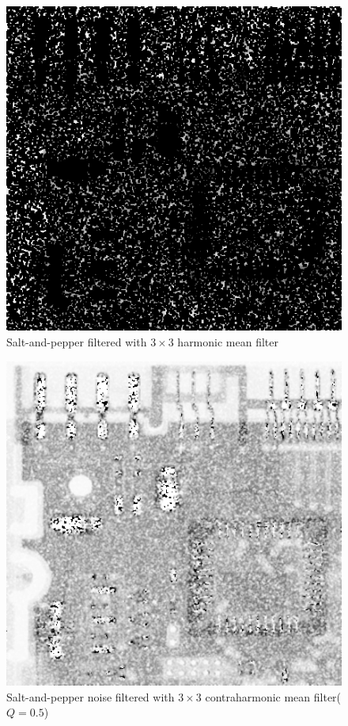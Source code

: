\documentclass{article}
\begin{document}
\begin{figure}[H]
	\centering
	\includegraphics[width=336pt]{../result/task2/sap/sap-harmonic.png}
	\caption{Salt-and-pepper filtered with $3 \times 3$ harmonic mean filter}
	\label{fig:saphm}
\end{figure}


\begin{figure}[H]
	\centering
	\includegraphics[width=336pt]{../result/task2/sap/sap-contraharmonic.png}
	\caption{Salt-and-pepper noise filtered with $3 \times 3$ contraharmonic mean filter($Q=0.5$)}
	\label{fig:sapchm}
\end{figure}
\end{document}
